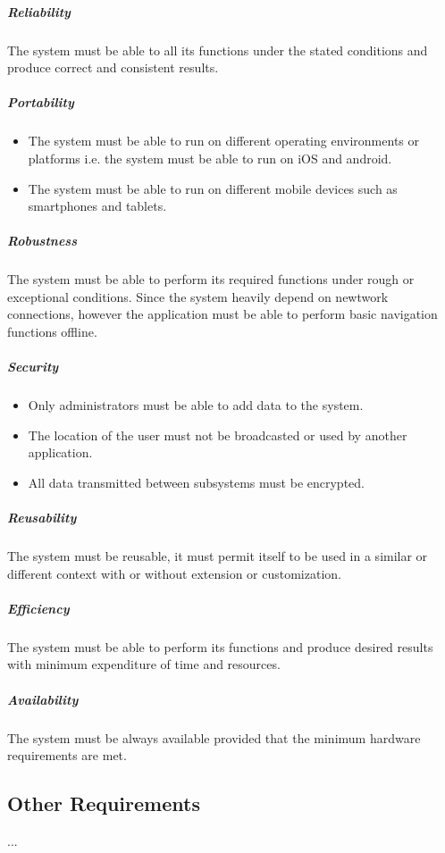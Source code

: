 \documentclass[english]{article}
\begin{document}
				\subparagraph{Reliability}
    				The system must be able to all its functions under the stated conditions and produce correct and consistent results. 
    				\subparagraph{Portability}
        				\begin{itemize}
            				\item The system must be able to run on different operating environments or platforms i.e. the system must be able to run on iOS and android.
            				\item The system must be able to run on different mobile devices such as smartphones and tablets.
        				\end{itemize}
    				\subparagraph{Robustness}
        				The system must be able to perform its required functions under rough or exceptional conditions. Since the system heavily depend on newtwork connections, however the application must be able to perform basic navigation functions offline.
    				\subparagraph{Security}
        				\begin{itemize}
            				\item Only administrators must be able to add data to the system.
            				\item The location of the user must not be broadcasted or used by another application. 
            				\item All data transmitted between subsystems must be encrypted.
        				\end{itemize}
    				\subparagraph{Reusability}
    				    The system must be reusable, it must permit itself to be used in a similar or different context with or without extension or customization.
    				\subparagraph{Efficiency}
    				    The system must be able to perform its functions and produce desired results with minimum expenditure of time and resources.
    				\subparagraph{Availability}
    				    The system must be always available provided that the minimum hardware requirements are met.
				
				\subsection{Other Requirements}
						...
\end{document}
